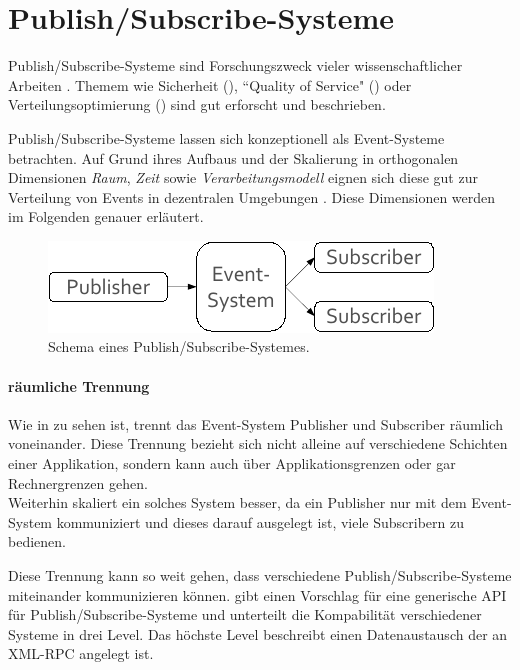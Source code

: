 \section{Publish/Subscribe-Systeme}
\label{chap:grundlagen:pubsub}
Publish/Subscribe-Systeme sind Forschungszweck vieler wissenschaftlicher Arbeiten \cite{Liu2003Survey, Banerjee2001Comparative}. Themem wie Sicherheit (\cite{FiegeSecurity}), ``Quality of Service" (\cite{BeFiMu2006PubSubQoS}) oder Verteilungsoptimierung (\cite{Muhl2002LargeScale, Castro2002Scribe}) sind gut erforscht und beschrieben.

Publish/Subscribe-Systeme lassen sich konzeptionell als Event-Systeme betrachten. Auf Grund ihres Aufbaus und der Skalierung  in orthogonalen Dimensionen \emph{Raum}, \emph{Zeit} sowie \emph{Verarbeitungsmodell} eignen sich diese gut zur Verteilung von Events in dezentralen Umgebungen \cite{PatrickTh2003Many}. Diese Dimensionen werden im Folgenden genauer erläutert.

\begin{figure}[htbp]
\centering
\includegraphics{grafics/pubsub_black_box.pdf}
\caption{Schema eines Publish/Subscribe-Systemes.}
\label{fig:pubsub_black_box}
\end{figure}

\paragraph{räumliche Trennung}
Wie in  zu sehen ist, trennt das Event-System Publisher und Subscriber räumlich voneinander. Diese Trennung bezieht sich nicht alleine auf verschiedene Schichten einer Applikation, sondern kann auch über Applikationsgrenzen oder gar Rechnergrenzen gehen. \\
Weiterhin skaliert ein solches System besser, da ein Publisher nur mit dem Event-System kommuniziert und dieses darauf ausgelegt ist, viele Subscribern zu bedienen.

Diese Trennung kann so weit gehen, dass verschiedene Publish/Subscribe-Systeme miteinander kommunizieren können. \cite{PiEyKoSh2007-PubSubAPI} gibt einen Vorschlag für eine generische API für Publish/Subscribe-Systeme und unterteilt die Kompabilität verschiedener Systeme in drei Level. Das höchste Level beschreibt einen Datenaustausch der an XML-RPC angelegt ist.

